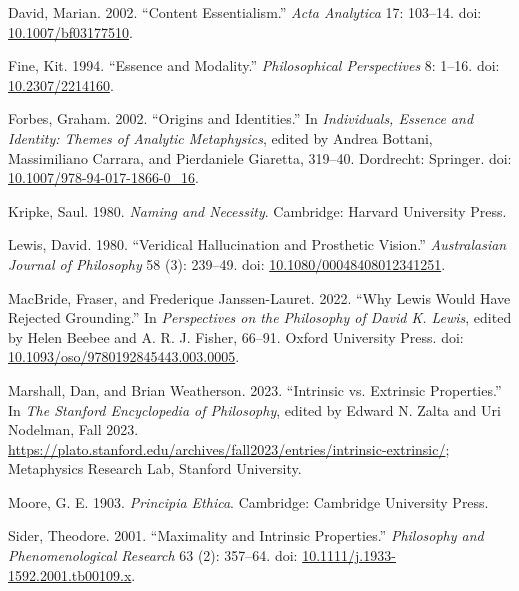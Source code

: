 \documentclass[
  11pt,
  letterpaper,
  DIV=11,
  numbers=noendperiod,
  twoside]{scrartcl}
\newlength{\cslhangindent}
\newenvironment{CSLReferences}[2] %
 {\begin{list}{}{%
  \setlength{\itemindent}{0pt}
  \setlength{\leftmargin}{0pt}
  \setlength{\parsep}{0pt}
  \ifodd #1
   \setlength{\leftmargin}{\cslhangindent}
   \setlength{\itemindent}{-1\cslhangindent}
  \fi
  \setlength{\itemsep}{#2\baselineskip}}}
 {\end{list}}
\begin{document}
\label{refs}
\begin{CSLReferences}{1}{0}
David, Marian. 2002. {``Content Essentialism.''} \emph{Acta Analytica}
17: 103--14. doi:
\href{https://doi.org/10.1007/bf03177510}{10.1007/bf03177510}.

Fine, Kit. 1994. {``Essence and Modality.''} \emph{Philosophical
Perspectives} 8: 1--16. doi:
\href{https://doi.org/10.2307/2214160}{10.2307/2214160}.

Forbes, Graham. 2002. {``Origins and Identities.''} In
\emph{Individuals, Essence and Identity: Themes of Analytic
Metaphysics}, edited by Andrea Bottani, Massimiliano Carrara, and
Pierdaniele Giaretta, 319--40. Dordrecht: Springer. doi:
\href{https://doi.org/10.1007/978-94-017-1866-0_16}{10.1007/978-94-017-1866-0\_16}.

Kripke, Saul. 1980. \emph{Naming and Necessity}. Cambridge: Harvard
University Press.

Lewis, David. 1980. {``Veridical Hallucination and Prosthetic Vision.''}
\emph{Australasian Journal of Philosophy} 58 (3): 239--49. doi:
\href{https://doi.org/10.1080/00048408012341251}{10.1080/00048408012341251}.

MacBride, Fraser, and Frederique Janssen-Lauret. 2022. {``Why Lewis
Would Have Rejected Grounding.''} In \emph{Perspectives on the
Philosophy of David {K}. Lewis}, edited by Helen Beebee and A. R. J.
Fisher, 66--91. {O}xford {U}niversity {P}ress. doi:
\href{https://doi.org/10.1093/oso/9780192845443.003.0005}{10.1093/oso/9780192845443.003.0005}.

Marshall, Dan, and Brian Weatherson. 2023. {``{Intrinsic vs. Extrinsic
Properties}.''} In \emph{The {Stanford} Encyclopedia of Philosophy},
edited by Edward N. Zalta and Uri Nodelman, {F}all 2023.
\url{https://plato.stanford.edu/archives/fall2023/entries/intrinsic-extrinsic/};
Metaphysics Research Lab, Stanford University.

Moore, G. E. 1903. \emph{Principia Ethica}. Cambridge: Cambridge
University Press.

Sider, Theodore. 2001. {``Maximality and Intrinsic Properties.''}
\emph{Philosophy and Phenomenological Research} 63 (2): 357--64. doi:
\href{https://doi.org/10.1111/j.1933-1592.2001.tb00109.x}{10.1111/j.1933-1592.2001.tb00109.x}.


\end{CSLReferences}
\end{document}
